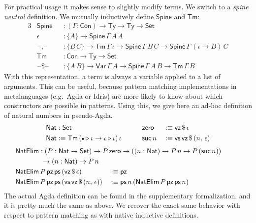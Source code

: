 \documentclass[12pt,a4paper,twoside,openany]{book}
\theoremstyle{remark}
\theoremstyle{definition}
\theoremstyle{theorem}
\newcommand{\ms}[1]{\mathsf{#1}}
\newcommand{\Con}{\mathsf{Con}}
\newcommand{\Tm}{\mathsf{Tm}}
\newcommand{\Ty}{\mathsf{Ty}}
\newcommand{\blank}{\mathord{\hspace{1pt}\text{--}\hspace{1pt}}}
\newcommand{\Set}{\mathsf{Set}}
\newcommand{\ext}{\triangleright}
\newcommand{\emptycon}{\scaleobj{.75}\bullet}
\newcommand{\Var}{\ms{Var}}
\newcommand{\vz}{\ms{vz}}
\newcommand{\vs}{\ms{vs}}
\newcommand{\Nat}{\ms{Nat}}
\newcommand{\defn}{:\equiv}
\begin{document}
For practical usage it makes sense to slightly modify terms. We switch to a
\emph{spine neutral} definition. We mutually inductively define $\ms{Spine}$ and
$\Tm$:
\begin{alignat*}{3}
  & \ms{Spine} &&: (\Gamma : \Con) \to \Ty \to \Ty \to \Set \\
  & \epsilon &&: \{A\} \to \ms{Spine}\,\Gamma\,A\,A\\
  & \blank\!,\!\blank &&: \{B\,C\} \to \Tm\,\Gamma\,\iota \to \ms{Spine}\,\Gamma\,B\,C \to \ms{Spine}\,\Gamma\,(\iota\to B)\,C\\
  & \Tm  &&: \Con \to \Ty \to \Set \\
  & \blank\$\blank &&: \{A\,B\} \to \Var\,\Gamma\,A \to \ms{Spine}\,\Gamma\,A\,B \to \Tm\,\Gamma\,B
\end{alignat*}
With this representation, a term is always a variable applied to a list of
arguments. This can be useful, because pattern matching implementations in
metalanguages (e.g.\ Agda or Idris) are more likely to know about which
constructors are possible in patterns. Using this, we give here an ad-hoc
definition of natural numbers in pseudo-Agda.
\begin{alignat*}{3}
  &\Nat : \Set && \ms{zero} &&\defn \vz\,\$\,\epsilon\\
  &\Nat \defn \Tm\,(\emptycon\ext \iota\to \iota \ext \iota)\,\iota\hspace{2em} && \ms{suc}\,n &&\defn \vs\,\vz\,\$\,(n,\,\epsilon)
\end{alignat*}
\begin{alignat*}{3}
  &\hspace{-6.5em}\rlap{$\ms{NatElim} : (P : \Nat \to \Set) \to P\,\ms{zero}\to ((n : \Nat) \to P\,n \to P\,(\ms{suc}\,n))$}\\
  &\hspace{-6.5em}\rlap{$\hspace{4em}\to (n : \Nat) \to P\,n$}\\
  &\hspace{-6.5em}\ms{NatElim}\,P\,\ms{pz}\,\ms{ps}\,(\vz\,\$\,\epsilon) &&\defn \ms{pz}\\
  &\hspace{-6.5em}\ms{NatElim}\,P\,\ms{pz}\,\ms{ps}\,(\vs\,\vz\,\$\,(n,\,\epsilon)) &&\defn
    \ms{ps}\,n\,(\ms{NatElim}\,P\,\ms{pz}\,\ms{ps}\,n)
\end{alignat*}
The actual Agda definition can be found in the supplementary formalization, and
it is pretty much the same as above. We recover the exact same behavior with
respect to pattern matching as with native inductive definitions.
\end{document}
